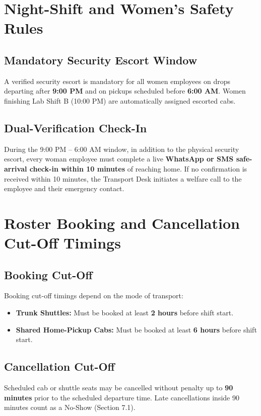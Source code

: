 \documentclass[11pt,a4paper]{article}
\begin{document}
\section{Night-Shift and Women's Safety Rules}
\subsection{Mandatory Security Escort Window}
A verified security escort is mandatory for all women employees on drops departing after \textbf{9:00 PM} and on pickups scheduled before \textbf{6:00 AM}. Women finishing Lab Shift B (10:00 PM) are automatically assigned escorted cabs.

\subsection{Dual-Verification Check-In}
During the 9:00 PM -- 6:00 AM window, in addition to the physical security escort, every woman employee must complete a live \textbf{WhatsApp or SMS safe-arrival check-in within 10 minutes} of reaching home. If no confirmation is received within 10 minutes, the Transport Desk initiates a welfare call to the employee and their emergency contact.

\section{Roster Booking and Cancellation Cut-Off Timings}
\subsection{Booking Cut-Off}
Booking cut-off timings depend on the mode of transport:
\begin{itemize}[noitemsep]
    \item \textbf{Trunk Shuttles:} Must be booked at least \textbf{2 hours} before shift start.
    \item \textbf{Shared Home-Pickup Cabs:} Must be booked at least \textbf{6 hours} before shift start.
\end{itemize}

\subsection{Cancellation Cut-Off}
Scheduled cab or shuttle seats may be cancelled without penalty up to \textbf{90 minutes} prior to the scheduled departure time. Late cancellations inside 90 minutes count as a No-Show (Section 7.1).
\end{document}
